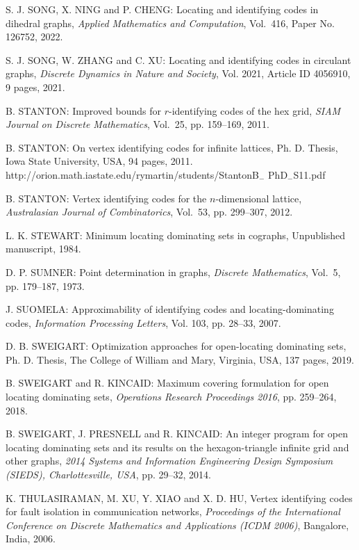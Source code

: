\begin{thebibliography}{999}
S. J. SONG, X. NING and P. CHENG: Locating and identifying codes in dihedral graphs, {\it Applied Mathematics and Computation}, Vol.~416, Paper No. 126752, 2022.

S. J. SONG, W. ZHANG and C. XU: Locating and identifying codes in circulant graphs, {\it Discrete Dynamics in Nature and Society}, Vol. 2021, Article ID 4056910, 9 pages, 2021.

B. STANTON: Improved bounds for $r$-identifying codes of the hex grid, {\it SIAM Journal on Discrete Mathematics}, Vol.~25, pp. 159--169, 2011.

B. STANTON: On vertex identifying codes for infinite lattices, Ph. D. Thesis, Iowa State University, USA, 94 pages, 2011.\\
http://orion.math.iastate.edu/rymartin/students/StantonB$_{-}$ PhD$_{-}$S11.pdf

B. STANTON: Vertex identifying codes for the $n$-dimensional lattice, {\it Australasian Journal of Combinatorics}, Vol.~53, pp. 299--307, 2012.

L. K. STEWART: Minimum locating dominating sets in cographs, Unpublished manuscript, 1984.

 D. P. SUMNER: Point determination in graphs, {\it Discrete Mathematics}, Vol.~5, pp. 179--187, 1973.

J. SUOMELA: Approximability of identifying codes and locating-dominating codes, {\it Information Processing Letters}, Vol. 103, pp. 28--33, 2007.

D. B. SWEIGART:  Optimization approaches for open-locating dominating sets, Ph. D. Thesis, The College of William and Mary, Virginia, USA, 137 pages, 2019.

B. SWEIGART and R. KINCAID: Maximum covering formulation for open locating dominating sets, {\it Operations Research Proceedings 2016}, pp. 259--264, 2018.

B. SWEIGART, J. PRESNELL and R. KINCAID: An integer program for open locating dominating sets and its results on the hexagon-triangle infinite grid and other graphs, {\it 2014 Systems and Information Engineering Design Symposium (SIEDS), Charlottesville, USA}, pp. 29--32, 2014.

K. THULASIRAMAN, M. XU, Y. XIAO and X. D. HU, Vertex identifying codes for fault isolation in communication networks, {\it Proceedings of the International Conference on Discrete Mathematics and Applications (ICDM 2006)}, Bangalore, India, 2006.


\end{thebibliography}
